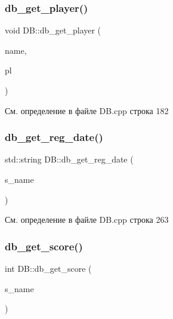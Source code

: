 \mbox{\label{class_d_b_a1e5d244a838c99a8753727cf0abd1f70}} 
\subsubsection{\texorpdfstring{db\_get\_player()}{db\_get\_player()}}
{\footnotesize\ttfamily void D\+B\+::db\+\_\+get\+\_\+player (\begin{DoxyParamCaption}\item[{std\+::string $\ast$}]{name,  }\item[{\mbox{\hyperlink{structdb__player}{db\+\_\+player}} $\ast$}]{pl }\end{DoxyParamCaption})}



См. определение в файле D\+B.\+cpp строка 182

\mbox{\label{class_d_b_ad7c6310d2669acd40978fd4662f90d53}} 
\subsubsection{\texorpdfstring{db\_get\_reg\_date()}{db\_get\_reg\_date()}}
{\footnotesize\ttfamily std\+::string D\+B\+::db\+\_\+get\+\_\+reg\+\_\+date (\begin{DoxyParamCaption}\item[{std\+::string $\ast$}]{s\+\_\+name }\end{DoxyParamCaption})}



См. определение в файле D\+B.\+cpp строка 263

\mbox{\label{class_d_b_a990cefb97ea7222649511f37334a8601}} 
\subsubsection{\texorpdfstring{db\_get\_score()}{db\_get\_score()}}
{\footnotesize\ttfamily int D\+B\+::db\+\_\+get\+\_\+score (\begin{DoxyParamCaption}\item[{std\+::string $\ast$}]{s\+\_\+name }\end{DoxyParamCaption})}



